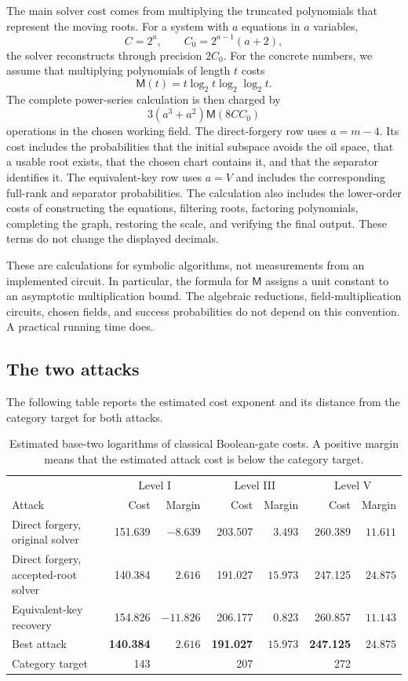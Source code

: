 \documentclass[11pt,a4paper]{article}
\theoremstyle{definition}
\theoremstyle{remark}
\newcommand{\Mmul}{\mathsf M}
\begin{document}
The main solver cost comes from multiplying the truncated polynomials that
represent the moving roots.  For a system with $a$ equations in $a$ variables,
\[
 C=2^a,
 \qquad C_0=2^{a-1}(a+2),
\]
the solver reconstructs through precision $2C_0$.  For the concrete numbers,
we assume that multiplying polynomials of length $t$ costs
\[
 \Mmul(t)=t\log_2t\log_2\log_2t.
\]
The complete power-series calculation is then charged by
\begin{equation}\label{eq:unified-flat-cost}
 3(a^3+a^2)\Mmul(8CC_0)
\end{equation}
operations in the chosen working field.  The direct-forgery row uses
$a=m-4$.  Its cost includes the probabilities that the initial subspace avoids
the oil space, that a usable root exists, that the chosen chart contains it,
and that the separator identifies it.  The equivalent-key row uses $a=V$ and
includes the corresponding full-rank and separator probabilities.  The
calculation also includes the lower-order costs of constructing the equations,
filtering roots, factoring polynomials, completing the graph, restoring the
scale, and verifying the final output.  These terms do not change the displayed
decimals.

These are calculations for symbolic algorithms, not measurements from an
implemented circuit.  In particular, the formula for $\Mmul$ assigns a unit
constant to an asymptotic multiplication bound.  The algebraic reductions,
field-multiplication circuits, chosen fields, and success probabilities do not
depend on this convention.  A practical running time does.

\subsection{The two attacks}
The following table reports the estimated cost exponent and its distance from
the category target for both attacks.
\begin{table}[t]
\centering
\small
\setlength{\tabcolsep}{5pt}
\caption{Estimated base-two logarithms of classical Boolean-gate costs.  A
positive margin means that the estimated attack cost is below the category
target.}
\label{tab:combined-costs}
\begin{tabular}{@{}lrrrrrr@{}}
\toprule
& \multicolumn{2}{c}{Level I} & \multicolumn{2}{c}{Level III} & \multicolumn{2}{c}{Level V}\\
Attack & Cost & Margin & Cost & Margin & Cost & Margin\\
\midrule
Direct forgery, original solver
 &151.639&$-8.639$&203.507&$3.493$&260.389&$11.611$\\
Direct forgery, accepted-root solver
 &140.384&$2.616$&191.027&$15.973$&247.125&$24.875$\\
Equivalent-key recovery
 &154.826&$-11.826$&206.177&$0.823$&260.857&$11.143$\\
\midrule
Best attack
 &\textbf{140.384}&$\mathbf{2.616}$
 &\textbf{191.027}&$\mathbf{15.973}$
 &\textbf{247.125}&$\mathbf{24.875}$\\
\midrule
Category target &143&&207&&272&\\
\bottomrule
\end{tabular}
\end{table}
\end{document}
